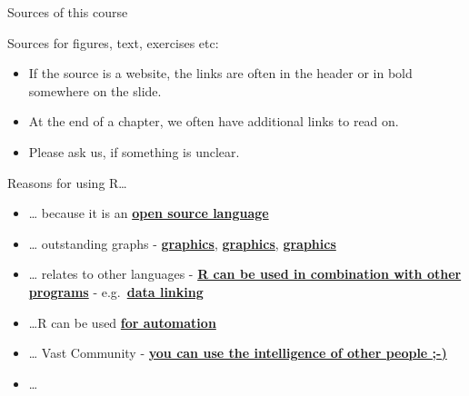 \documentclass[
  10pt,
  ignorenonframetext,
]{beamer}
\providecommand{\tightlist}{%
  \setlength{\itemsep}{0pt}\setlength{\parskip}{0pt}}
\begin{document}
\begin{frame}{Sources of this course}
\protect\hypertarget{sources-of-this-course}{}

\begin{block}{Sources for figures, text, exercises etc:}

\begin{itemize}
\tightlist
\item
  If the source is a website, the links are often in the header or in
  bold somewhere on the slide.
\item
  At the end of a chapter, we often have additional links to read on.
\item
  Please ask us, if something is unclear.
\end{itemize}

\end{block}

\end{frame}

\begin{frame}{Reasons for using R\ldots{}}
\protect\hypertarget{reasons-for-using-r}{}

\begin{itemize}
\tightlist
\item
  \ldots{} because it is an
  \href{https://stackoverflow.com/questions/1546583/what-is-the-definition-of-an-open-source-programming-language}{\textbf{open
  source language}}
\item
  \ldots{} outstanding graphs -
  \href{http://matthewlincoln.net/2014/12/20/adjacency-matrix-plots-with-r-and-ggplot2.html}{\textbf{graphics}},
  \href{https://www.r-bloggers.com/3d-plots-with-ggplot2-and-plotly\%20/}{\textbf{graphics}},
  \href{https://procomun.wordpress.com/2011/03/18/splomr/}{\textbf{graphics}}
\item
  \ldots{} relates to other languages -
  \href{https://github.com/Japhilko/RInterfaces}{\textbf{R can be used
  in combination with other programs}} -
  e.g.~\href{https://github.com/Japhilko/RInterfaces/blob/master/slides/Datenimport.md}{\textbf{data
  linking}}
\item
  \ldots{}R can be used
  \href{https://cran.r-project.org/web/packages/MplusAutomation/index.html}{\textbf{for
  automation}}
\item
  \ldots{} Vast Community -
  \href{https://www.r-bloggers.com/}{\textbf{you can use the
  intelligence of other people ;-)}}
\item
  \ldots{}
\end{itemize}

\end{frame}
\end{document}
